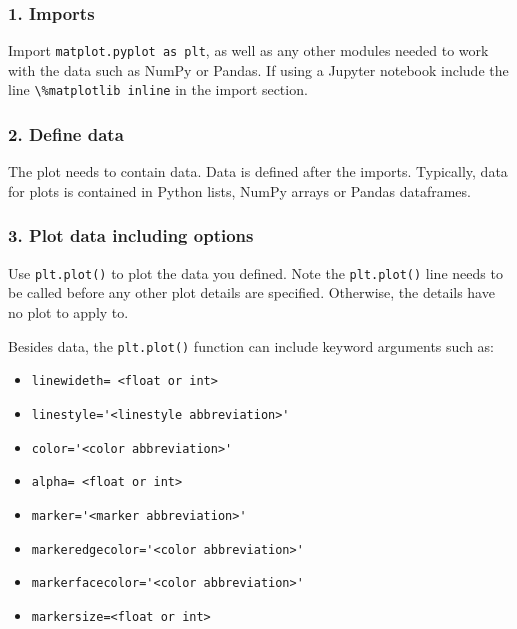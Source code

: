 \documentclass{book}
\providecommand{\tightlist}{%
      \setlength{\itemsep}{0pt}\setlength{\parskip}{0pt}}
\newcommand{\passthrough}[1]{#1}
\begin{document}
\hypertarget{imports}{%
\subsubsection{1. Imports}\label{imports}}

Import \passthrough{\lstinline!matplot.pyplot as plt!}, as well as any
other modules needed to work with the data such as NumPy or Pandas. If
using a Jupyter notebook include the line
\passthrough{\lstinline!\%matplotlib inline!} in the import section.

\hypertarget{define-data}{%
\subsubsection{2. Define data}\label{define-data}}

The plot needs to contain data. Data is defined after the imports.
Typically, data for plots is contained in Python lists, NumPy arrays or
Pandas dataframes.

\hypertarget{plot-data-including-options}{%
\subsubsection{3. Plot data including
options}\label{plot-data-including-options}}

Use \passthrough{\lstinline!plt.plot()!} to plot the data you defined.
Note the \passthrough{\lstinline!plt.plot()!} line needs to be called
before any other plot details are specified. Otherwise, the details have
no plot to apply to.

Besides data, the \passthrough{\lstinline!plt.plot()!} function can
include keyword arguments such as:

\begin{itemize}
\tightlist
\item
  \passthrough{\lstinline!linewideth= <float or int>!}
\item
  \passthrough{\lstinline!linestyle='<linestyle abbreviation>'!}
\item
  \passthrough{\lstinline!color='<color abbreviation>'!}
\item
  \passthrough{\lstinline!alpha= <float or int>!}
\item
  \passthrough{\lstinline!marker='<marker abbreviation>'!}
\item
  \passthrough{\lstinline!markeredgecolor='<color abbreviation>'!}
\item
  \passthrough{\lstinline!markerfacecolor='<color abbreviation>'!}
\item
  \passthrough{\lstinline!markersize=<float or int>!}
\end{itemize}
\end{document}
